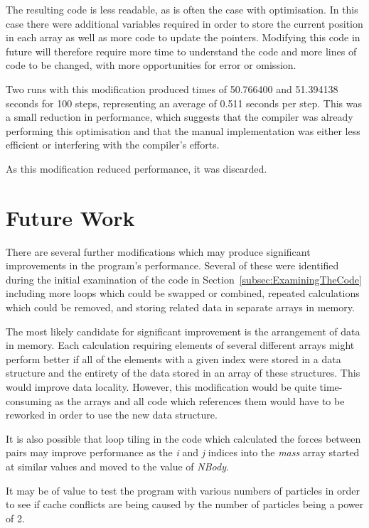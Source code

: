 \documentclass[11pt, oneside]{article}   %
\begin{document}
The resulting code is less readable, as is often the case with optimisation.
In this case there were additional variables required in order to store the current position in each array as well as more code to update the pointers.
Modifying this code in future will therefore require more time to understand the code and more lines of code to be changed, with more opportunities for error or omission.

Two runs with this modification produced times of 50.766400 and 51.394138 seconds for 100 steps, representing an average of 0.511 seconds per step.
This was a small reduction in performance, which suggests that the compiler was already performing this optimisation and that the manual implementation was either less efficient or interfering with the compiler's efforts.

As this modification reduced performance, it was discarded.

\section{Future Work}

There are several further modifications which may produce significant improvements in the program's performance.
Several of these were identified during the initial examination of the code in Section~\ref{subsec:ExaminingTheCode} including more loops which could be swapped or combined, repeated calculations which could be removed, and storing related data in separate arrays in memory. 

The most likely candidate for significant improvement is the arrangement of data in memory.
Each calculation requiring elements of several different arrays might perform better if all of the elements with a given index were stored in a data structure and the entirety of the data stored in an array of these structures.
This would improve data locality.
However, this modification would be quite time-consuming as the arrays and all code which references them would have to be reworked in order to use the new data structure.

It is also possible that loop tiling in the code which calculated the forces between pairs may improve performance as the {\em i} and {\em j} indices into the {\em mass} array started at similar values and moved to the value of {\em NBody}.  

It may be of value to test the program with various numbers of particles in order to see if cache conflicts are being caused by the number of particles being a power of 2.
\end{document}
